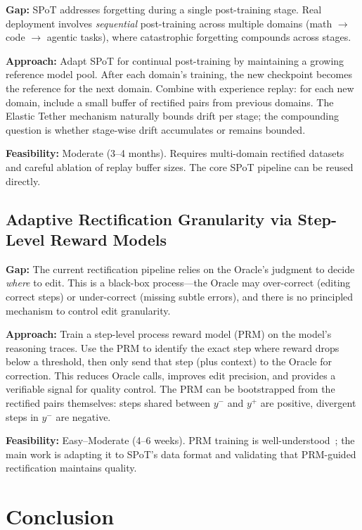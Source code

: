\documentclass[11pt]{article}
\begin{document}
\textbf{Gap:} SPoT addresses forgetting during a single post-training stage. Real deployment involves \emph{sequential} post-training across multiple domains (math $\to$ code $\to$ agentic tasks), where catastrophic forgetting compounds across stages.

\textbf{Approach:} Adapt SPoT for continual post-training by maintaining a growing reference model pool. After each domain's training, the new checkpoint becomes the reference for the next domain. Combine with experience replay: for each new domain, include a small buffer of rectified pairs from previous domains. The Elastic Tether mechanism naturally bounds drift per stage; the compounding question is whether stage-wise drift accumulates or remains bounded.

\textbf{Feasibility:} Moderate (3--4 months). Requires multi-domain rectified datasets and careful ablation of replay buffer sizes. The core SPoT pipeline can be reused directly.

\subsection{Adaptive Rectification Granularity via Step-Level Reward Models}

\textbf{Gap:} The current rectification pipeline relies on the Oracle's judgment to decide \emph{where} to edit. This is a black-box process---the Oracle may over-correct (editing correct steps) or under-correct (missing subtle errors), and there is no principled mechanism to control edit granularity.

\textbf{Approach:} Train a step-level process reward model (PRM) on the model's reasoning traces. Use the PRM to identify the exact step where reward drops below a threshold, then only send that step (plus context) to the Oracle for correction. This reduces Oracle calls, improves edit precision, and provides a verifiable signal for quality control. The PRM can be bootstrapped from the rectified pairs themselves: steps shared between $y^-$ and $y^+$ are positive, divergent steps in $y^-$ are negative.

\textbf{Feasibility:} Easy--Moderate (4--6 weeks). PRM training is well-understood~\citep{lightman2023verify}; the main work is adapting it to SPoT's data format and validating that PRM-guided rectification maintains quality.

\section{Conclusion}
\end{document}
